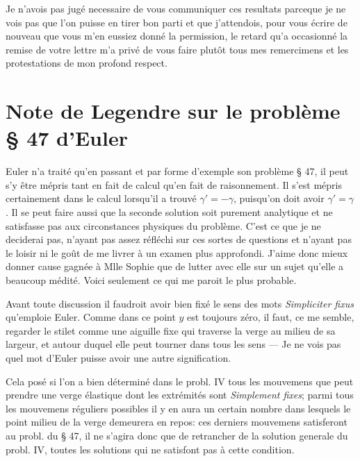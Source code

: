 \documentclass[11pt,a4paper]{article}
\begin{document}

Je n'avois pas jugé necessaire de vous communiquer ces resultats parceque je
ne vois pas que l'on puisse en tirer bon parti et que j'attendois, pour vous
écrire de nouveau que vous m'en eussiez donné la permission,  le
retard qu'a occasionné  la remise de votre lettre m'a privé
de vous faire plutôt  tous mes remercimens et les protestations
de mon profond respect.

\section{Note de Legendre sur le problème § 47 d'Euler}

Euler n'a traité qu'en passant et par forme d'exemple son problème § 47, il
peut s'y être mépris tant en fait de calcul qu'en fait de raisonnement. Il
s'est mépris certainement dans le calcul lorsqu'il a trouvé
$\gamma' = -\gamma$, puisqu'on doit avoir $\gamma' = \gamma$. Il se peut
faire aussi que la seconde solution soit purement analytique et ne
satisfasse pas aux circonstances physiques du problème. C'est ce que je ne
deciderai pas, n'ayant pas assez réfléchi sur ces sortes de questions et
n'ayant pas le loisir ni le goût de me livrer à un examen plus approfondi.
J'aime donc mieux donner cause gagnée à Mlle Sophie que de lutter avec elle
sur un sujet qu'elle a beaucoup médité. Voici seulement ce qui me paroit le
plus probable.


Avant toute discussion il faudroit avoir bien fixé le sens des mots
\emph{Simpliciter fixus} qu'emploie Euler. Comme dans ce point $y$ est
toujours zéro, il faut, ce me semble, regarder le stilet comme une aiguille
fixe qui traverse la verge au milieu de sa largeur, et autour duquel elle
peut tourner dans tous les sens — Je ne vois pas quel mot d'Euler puisse
avoir une autre signification.


Cela posé si l'on a bien déterminé dans le probl. IV tous les mouvemens que
peut prendre une verge élastique dont les extrémités sont \emph{Simplement
fixes}; parmi tous les mouvemens réguliers possibles il y en aura un certain
nombre dans lesquels le point milieu de la verge demeurera en repos: ces
derniers mouvemens satisferont au probl. du § 47, il ne s'agira donc que de
retrancher de la solution generale du probl. IV, toutes les solutions qui ne
satisfont pas à cette condition.
\end{document}
